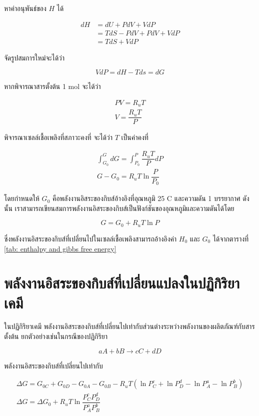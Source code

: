 \documentclass[a4paper,nobib,openany,10pt]{tufte-book}
\begin{document}
หาค่าอนุพันธ์ของ \(H\) ได้

\[\begin{aligned}
  dH &= dU + PdV + VdP \nonumber \\
     &= TdS - PdV + PdV + VdP \nonumber \\
     &= TdS + VdP\end{aligned}\]

จัดรูปสมการใหม่จะได้ว่า

\[VdP = dH - Tds = dG\]

หากพิจารณาสารตั้งต้น 1 mol จะได้ว่า

\[\begin{gathered}
  PV = R_u T \\
  V = \dfrac{R_u T}{P}\end{gathered}\]

พิจารณาเซลล์เชื้อเพลิงที่สภาวะคงที่ จะได้ว่า \(T\) เป็นค่าคงที่

\[\begin{gathered}
  \int_{G_0}^G dG = \int_{P_0}^P \dfrac{R_uT}{P}dP \\
  G - G_0 = R_u T \ln \dfrac{P}{P_0}\end{gathered}\]

โดยกำหนดให้ \(G_0\) คือพลังงานอิสระของกิบส์อ้างอิงที่อุณหภูมิ 25 C
และความดัน 1 บรรยากาศ ดังนั้น
เราสามารถเขียนสมการพลังงานอิสระของกิบส์เป็นฟังก์ชันของอุณหภูมิและความดันได้โดย

\[G = G_0 + R_u T \ln P\]

ซึ่งพลังงานอิสระของกิบส์ที่เปลี่ยนไปในเซลล์เชื้อเพลิงสามารถอ้างอิงค่า
\(H_0\) และ \(G_0\) ได้จากตารางที่ \ref{tab: enthalpy and gibbs free energy}

\section{พลังงานอิสระของกิบส์ที่เปลี่ยนแปลงในปฏิกิริยาเคมี}
\label{sec:org987ad08}
ในปฏิกิริยาเคมี
พลังงานอิสระของกิบส์ที่เปลี่ยนไปเท่ากับส่วนต่างระหว่างพลังงานของผลิตภัณฑ์กับสารตั้งต้น
ยกตัวอย่างเช่นในกรณีของปฏิกิริยา

\[aA + bB \rightarrow cC + dD\]

พลังงานอิสระของกิบส์ที่เปลี่ยนไปเท่ากับ

\begin{gather*}
  \Delta G = G_{0C} + G_{0D} - G_{0A} - G_{0B} - R_u T \left( \ln P_C^c + \ln P_D^d - \ln P_A^a - \ln P_B^b \right) \nonumber \\
  \Delta G = \Delta G_0 + R_u T \ln \dfrac{P_C^c P_D^d}{P_A^a P_B^b}
\end{gather*}
\end{document}
